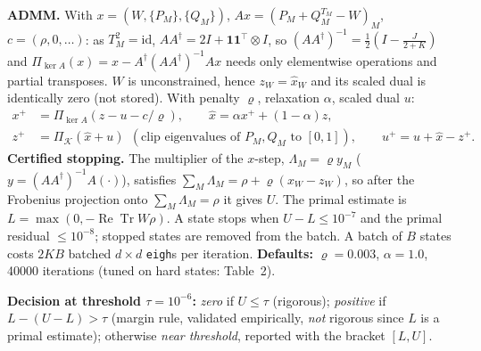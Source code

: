 \documentclass[10pt]{article}
\newcommand{\Tr}{\operatorname{Tr}}
\begin{document}
\textbf{ADMM.} With $x=(W,\{P_M\},\{Q_M\})$, $Ax=(P_M+Q_M^{T_M}-W)_M$, $c=(\rho,0,\dots)$: as $T_M^2=\mathrm{id}$, $AA^\dagger=2I+\mathbf 1\mathbf 1^{\!\top}\!\otimes I$, so $(AA^\dagger)^{-1}=\tfrac12(I-\tfrac{J}{2+K})$ and $\Pi_{\ker A}(x)=x-A^\dagger(AA^\dagger)^{-1}Ax$ needs only elementwise operations and partial transposes. $W$ is unconstrained, hence $z_W=\hat x_W$ and its scaled dual is identically zero (not stored). With penalty $\varrho$, relaxation $\alpha$, scaled dual $u$:
\begin{align}
x^{+}&=\Pi_{\ker A}(z-u-c/\varrho),\qquad \hat x=\alpha x^{+}+(1-\alpha)z,\\
z^{+}&=\Pi_{\mathcal K}(\hat x+u)\ \ (\text{clip eigenvalues of }P_M,Q_M\text{ to }[0,1]),\qquad u^{+}=u+\hat x-z^{+}.
\end{align}
\textbf{Certified stopping.} The multiplier of the $x$-step, $\Lambda_M=\varrho y_M$ ($y=(AA^\dagger)^{-1}A(\cdot)$), satisfies $\sum_M\Lambda_M=\rho+\varrho(x_W-z_W)$, so after the Frobenius projection onto $\sum_M\Lambda_M=\rho$ it gives $U$. The primal estimate is $L=\max(0,-\operatorname{Re}\Tr W\rho)$. A state stops when $U-L\le10^{-7}$ and the primal residual $\le10^{-8}$; stopped states are removed from the batch. A batch of $B$ states costs $2KB$ batched $d\times d$ \texttt{eigh}s per iteration.
\textbf{Defaults:} $\varrho=0.003$, $\alpha=1.0$, 40000 iterations (tuned on hard states: Table~2).

\textbf{Decision at threshold $\tau=10^{-6}$:} \emph{zero} if $U\le\tau$ (rigorous); \emph{positive} if $L-(U-L)>\tau$ (margin rule, validated empirically, \emph{not} rigorous since $L$ is a primal estimate); otherwise \emph{near threshold}, reported with the bracket $[L,U]$.
\end{document}
